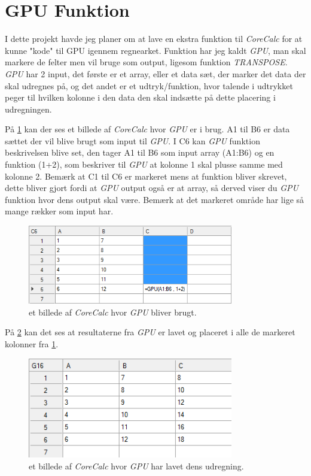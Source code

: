 \section{GPU Funktion}
I dette projekt havde jeg planer om at lave en ekstra funktion til \textit{CoreCalc} for at kunne "kode" til GPU igennem regnearket. Funktion har jeg kaldt \emph{GPU}, man skal markere de felter men vil bruge som output, ligesom funktion \textit{TRANSPOSE}. \emph{GPU} har 2 input, det første er et array, eller et data sæt, der marker det data der skal udregnes på, og det andet er et udtryk/funktion, hvor talende i udtrykket peger til hvilken kolonne i den data den skal indsætte på dette placering i udregningen.

På \ref{fig:corecalc1} kan der ses et billede af \textit{CoreCalc} hvor \textit{GPU} er i brug. A1 til B6 er data sættet der vil blive brugt som input til \textit{GPU}. I C6 kan \textit{GPU} funktion beskrivelsen blive set, den tager A1 til B6 som input array (A1:B6) og en funktion (1+2), som beskriver til \textit{GPU} at kolonne 1 skal plusse samme med kolonne 2. Bemærk at C1 til C6 er markeret mens at funktion bliver skrevet, dette bliver gjort fordi at \textit{GPU} output også er at array, så derved viser du \textit{GPU} funktion hvor dens output skal være. Bemærk at det markeret område har lige så mange rækker som input har.

\begin{figure}[p]
    \centering
    \includegraphics[width=0.8\textwidth]{Content/Graphic/corecalc1.png}
    \caption{et billede af \textit{CoreCalc} hvor \textit{GPU} bliver brugt.}
    \label{fig:corecalc1}
\end{figure}

På \ref{fig:corecalc2} kan det ses at resultaterne fra \textit{GPU} er lavet og placeret i alle de markeret kolonner fra \ref{fig:corecalc1}.

\begin{figure}[p]
    \centering
    \includegraphics[width=0.8\textwidth]{Content/Graphic/corecalc2.png}
    \caption{et billede af \textit{CoreCalc} hvor \textit{GPU} har lavet dens udregning.}
    \label{fig:corecalc2}
\end{figure}